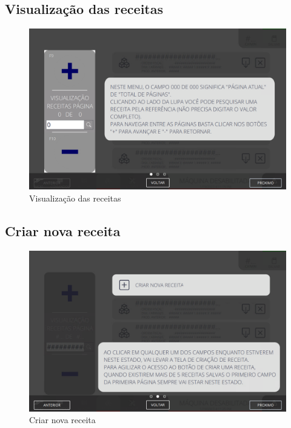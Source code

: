 \thispagestyle{fancy}
\vspace{\fill}

\subsection{\small Visualização das receitas}
\begin{figure}
    \centering
    \includegraphics[width=480 px,height=300 px]{src/imagesICV/09-request/visualization/e-1.png}
    \caption{Visualização das receitas}
\end{figure}
\newpage

\thispagestyle{fancy}
\vspace{\fill}
\subsection{\small Criar nova receita}
\begin{figure}
    \centering
    \includegraphics[width=576 px,height=360 px]{src/imagesICV/09-request/visualization/e-2.png}
    \caption{Criar nova receita}
\end{figure}
\newpage


